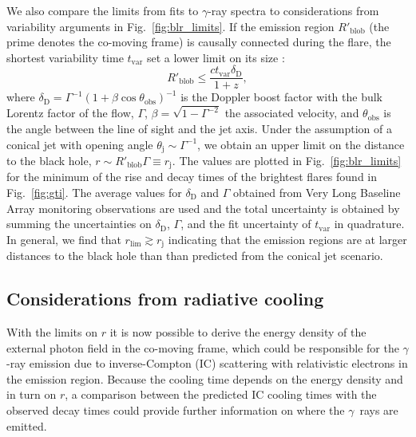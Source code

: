 \documentclass[twocolumn]{aastex62}
\newcommand{\Grays}{$\gamma$~rays\xspace}
\newcommand{\gray}{$\gamma$-ray\xspace}
\begin{document}
We also compare the limits from fits to \gray spectra to considerations from variability arguments in Fig.~\ref{fig:blr_limits}.
If the emission region $R'_\mathrm{blob}$ (the prime denotes the co-moving frame) is causally connected during the flare, the shortest variability time $t_\mathrm{var}$ set a lower limit on its size \citep[e.g.,][]{2008MNRAS.384L..19B}:
\begin{equation}
    R'_\mathrm{blob} \leqslant \frac{ct_\mathrm{var}\delta_\mathrm{D}}{1+z},  
\end{equation}
where $\delta_\mathrm{D} = \Gamma^{-1}(1 + \beta\cos\theta_\mathrm{obs})^{-1}$ is the Doppler boost factor with the bulk Lorentz factor of the flow, $\Gamma$, $\beta = \sqrt{1 - \Gamma^{-2}}$ the associated velocity, and $\theta_\mathrm{obs} $ is the angle between the line of sight and the jet axis.
Under the assumption of a conical jet with opening angle $\theta_\mathrm{j} \sim \Gamma^{-1}$, we obtain an upper limit on the distance to the black hole, $r \sim R'_\mathrm{blob}\Gamma \equiv r_\mathrm{j}$.
The values are plotted in Fig.~\ref{fig:blr_limits} for the minimum of the rise and decay times of the brightest flares found in Fig.~\ref{fig:gti}.
The average values for $\delta_\mathrm{D}$ and $\Gamma$ obtained from Very Long Baseline Array monitoring observations are used \citep{2017ApJ...846...98J}  and the total  uncertainty is obtained by summing the uncertainties on $\delta_\mathrm{D}$, $\Gamma$, and the fit uncertainty of $t_\mathrm{var}$ in quadrature.
In general, we find that $r_\mathrm{lim} \gtrsim r_\mathrm{j}$ indicating that the emission regions are at larger distances to the black hole than than predicted from the conical jet scenario.  

\subsection{Considerations from radiative cooling}
With the limits on $r$ it is now possible to derive the energy density of the external photon field in the co-moving frame, which could be responsible for the \gray emission due to inverse-Compton (IC) scattering with relativistic electrons in the emission region. 
Because the cooling time depends on the energy density and in turn on $r$, a comparison between the predicted IC cooling times with the observed decay times could provide further information on where the \Grays are emitted.
\end{document}
